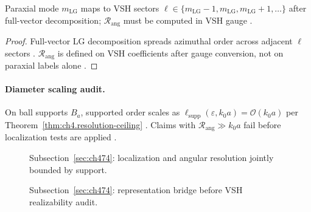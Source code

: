 \begin{lemma}
\label{lem:ch4.lg-vsh-spread}
Paraxial mode \(m_{\mathrm{LG}}\) maps to VSH sectors \(\ell\in\{m_{\mathrm{LG}}-1,m_{\mathrm{LG}},m_{\mathrm{LG}}+1,\ldots\}\) after full-vector
decomposition; \(\mathcal{R}_{\mathrm{ang}}\) must be computed in VSH gauge \cite{harrington2001,hansen1988,allen1992,stratton1941}.
\end{lemma}
\begin{proof}
Full-vector LG decomposition spreads azimuthal order across adjacent \(\ell\) sectors \cite{harrington2001,allen1992}. \(\mathcal{R}_{\mathrm{ang}}\) is
defined on VSH coefficients after gauge conversion, not on paraxial labels alone \cite{hansen1988,stratton1941,belinfante1940}.
\end{proof}

\paragraph{Diameter scaling audit.}
On ball supports \(B_{a}\), supported order scales as \(\ell_{\mathrm{supp}}(\varepsilon,k_{0}a)=\mathcal{O}(k_{0}a)\) per
Theorem~\ref{thm:ch4.resolution-ceiling} \cite{hansen1988,harrington2001,jackson1999}. Claims with \(\mathcal{R}_{\mathrm{ang}}\gg k_{0}a\) fail before
localization tests are applied \cite{stratton1941,devaney2004}.

\begin{figure}[t]
\centering
{}
\caption{Subsection~\ref{sec:ch474}: localization and angular resolution jointly bounded by support.}
\label{fig:ch4.loc-resolution-tradeoff}
\end{figure}

\begin{figure}[t]
\centering
{}
\caption{Subsection~\ref{sec:ch474}: representation bridge before VSH realizability audit.}
\label{fig:ch4.lg-vsh-bridge}
\end{figure}

